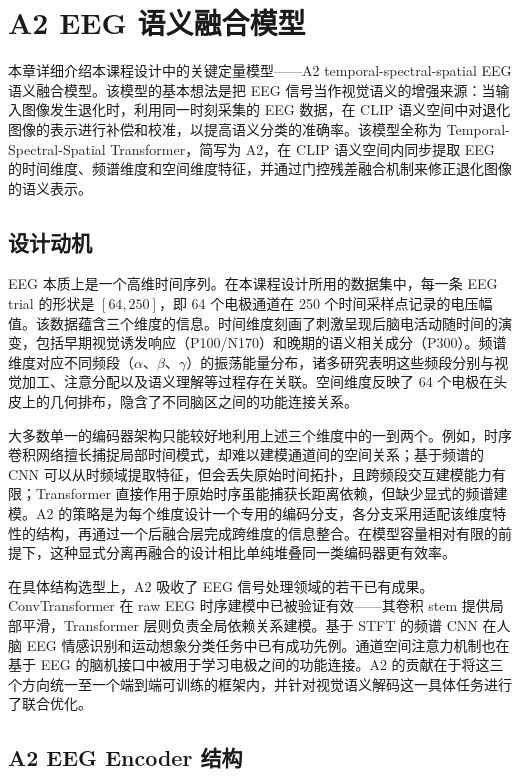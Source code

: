 \section{A2 EEG 语义融合模型}

本章详细介绍本课程设计中的关键定量模型——A2 temporal-spectral-spatial EEG 语义融合模型。该模型的基本想法是把 EEG 信号当作视觉语义的增强来源：当输入图像发生退化时，利用同一时刻采集的 EEG 数据，在 CLIP 语义空间中对退化图像的表示进行补偿和校准，以提高语义分类的准确率。该模型全称为 Temporal-Spectral-Spatial Transformer，简写为 A2，在 CLIP 语义空间内同步提取 EEG 的时间维度、频谱维度和空间维度特征，并通过门控残差融合机制来修正退化图像的语义表示。

\subsection{设计动机}

EEG 本质上是一个高维时间序列。在本课程设计所用的数据集中，每一条 EEG trial 的形状是 $[64, 250]$，即 64 个电极通道在 250 个时间采样点记录的电压幅值。该数据蕴含三个维度的信息。时间维度刻画了刺激呈现后脑电活动随时间的演变，包括早期视觉诱发响应（P100/N170）和晚期的语义相关成分（P300）。频谱维度对应不同频段（$\alpha$、$\beta$、$\gamma$）的振荡能量分布，诸多研究表明这些频段分别与视觉加工、注意分配以及语义理解等过程存在关联。空间维度反映了 64 个电极在头皮上的几何排布，隐含了不同脑区之间的功能连接关系。

大多数单一的编码器架构只能较好地利用上述三个维度中的一到两个。例如，时序卷积网络擅长捕捉局部时间模式，却难以建模通道间的空间关系；基于频谱的 CNN 可以从时频域提取特征，但会丢失原始时间拓扑，且跨频段交互建模能力有限；Transformer 直接作用于原始时序虽能捕获长距离依赖，但缺少显式的频谱建模。A2 的策略是为每个维度设计一个专用的编码分支，各分支采用适配该维度特性的结构，再通过一个后融合层完成跨维度的信息整合。在模型容量相对有限的前提下，这种显式分离再融合的设计相比单纯堆叠同一类编码器更有效率。

在具体结构选型上，A2 吸收了 EEG 信号处理领域的若干已有成果。ConvTransformer 在 raw EEG 时序建模中已被验证有效——其卷积 stem 提供局部平滑，Transformer 层则负责全局依赖关系建模。基于 STFT 的频谱 CNN 在人脑 EEG 情感识别和运动想象分类任务中已有成功先例。通道空间注意力机制也在基于 EEG 的脑机接口中被用于学习电极之间的功能连接。A2 的贡献在于将这三个方向统一至一个端到端可训练的框架内，并针对视觉语义解码这一具体任务进行了联合优化。

\subsection{A2 EEG Encoder 结构}

